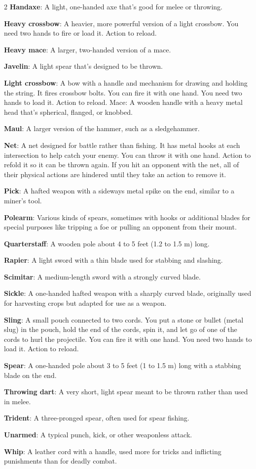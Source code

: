\begin{multicols}{2}
\textbf{Handaxe}: A light, one-handed axe that’s good for melee or throwing. 

\textbf{Heavy crossbow}: A heavier, more powerful version of a light crossbow. You need two hands to fire or load it. Action to reload. 

\textbf{Heavy mace}: A larger, two-handed version of a mace. 

\textbf{Javelin}: A light spear that’s designed to be thrown. 

\textbf{Light crossbow}: A bow with a handle and mechanism for drawing and holding the string. It fires crossbow bolts. You can fire it with one hand. You need two hands to load it. Action to reload. Mace: A wooden handle with a heavy metal head that’s spherical, flanged, or knobbed. 

\textbf{Maul}: A larger version of the hammer, such as a sledgehammer. 

\textbf{Net}: A net designed for battle rather than fishing. It has metal hooks at each intersection to help catch your enemy. You can throw it with one hand. Action to refold it so it can be thrown again. If you hit an opponent with the net, all of their physical actions are hindered until they take an action to remove it. 

\textbf{Pick}: A hafted weapon with a sideways metal spike on the end, similar to a miner’s tool. 

\textbf{Polearm}: Various kinds of spears, sometimes with hooks or additional blades for special purposes like tripping a foe or pulling an opponent from their mount. 

\textbf{Quarterstaff}: A wooden pole about 4 to 5 feet (1.2 to 1.5 m) long. 

\textbf{Rapier}: A light sword with a thin blade used for stabbing and slashing. 

\textbf{Scimitar}: A medium-length sword with a strongly curved blade. 

\textbf{Sickle}: A one-handed hafted weapon with a sharply curved blade, originally used for harvesting crops but adapted for use as a weapon. 

\textbf{Sling}: A small pouch connected to two cords. You put a stone or bullet (metal slug) in the pouch, hold the end of the cords, spin it, and let go of one of the cords to hurl the projectile. You can fire it with one hand. You need two hands to load it. Action to reload. 

\textbf{Spear}: A one-handed pole about 3 to 5 feet (1 to 1.5 m) long with a stabbing blade on the end. 

\textbf{Throwing dart}: A very short, light spear meant to be thrown rather than used in melee. 

\textbf{Trident}: A three-pronged spear, often used for spear fishing. 

\textbf{Unarmed}: A typical punch, kick, or other weaponless attack. 

\textbf{Whip}: A leather cord with a handle, used more for tricks and inflicting punishments than for deadly combat.

\end{multicols}
